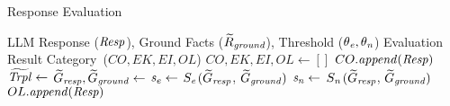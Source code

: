 \begin{algorithm}[!b]
\caption{Response Evaluation}
\label{alg:eval}
\small
\begin{algorithmic}[1]
\Require LLM Response ($\mathit{Resp}$), Ground Facts ($\widetilde{R}_{\mathit{ground}}$), Threshold ($\theta_{\mathit{e}}, \theta_{\mathit{n}}$)
\Ensure Evaluation Result Category~($CO, EK, EI, OL$)
    \State $CO, EK, EI, OL \gets []$ 
        \State
        $CO.\mathit{append}(\mathit{Resp})$ 
    \Else
        \State $\widetilde{\mathit{Trpl}} \gets$  
        \State $\widetilde{G}_{\mathit{resp}}, \widetilde{G}_{\mathit{ground}} \gets$  
        \State $\mathit{s}_{\mathit{e}} \gets$ $S_\mathit{e}${$(\widetilde{G}_{\mathit{resp}}$, $\widetilde{G}_{\mathit{ground}})$} 
        \State $\mathit{s}_{\mathit{n}} \gets$ $S_\mathit{n}${$(\widetilde{G}_{\mathit{resp}}$, $\widetilde{G}_{\mathit{ground}})$} 
            \State
            $OL.\mathit{append}(\mathit{Resp})$  
            \State 

\end{algorithmic}
\end{algorithm}
